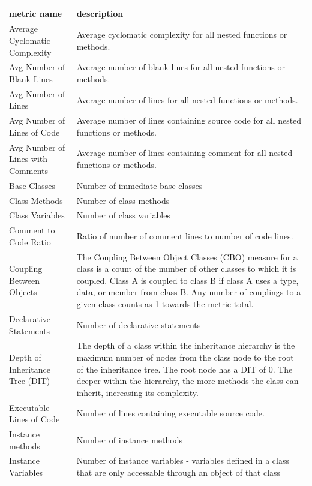 \begin{apendicesenv}
    \begin{center}
    \footnotesize
    \begin{longtabu} to 
    \toprule
    \textbf{metric name} & \textbf{description} \\ 
    \midrule
    \endhead
    Average Cyclomatic Complexity & Average cyclomatic complexity for all nested functions or methods. \\
    Avg Number of Blank Lines & Average number of blank lines for all nested functions or methods. \\
    Avg Number of Lines & Average number of lines for all nested functions or methods. \\
    Avg Number of Lines of Code & Average number of lines containing source code for all nested functions or methods. \\
    Avg Number of Lines with Comments & Average number of lines containing comment for all nested functions or methods. \\
    Base Classes & Number of immediate base classes \\
    Class Methods & Number of class methods \\
    Class Variables & Number of class variables \\
    Comment to Code Ratio & Ratio of number of comment lines to number of code lines. \\
    Coupling Between Objects & The Coupling Between Object Classes (CBO) measure for a class is a count of the number of other classes to which it is coupled. Class A is coupled to class B if class A uses a type, data, or member from class B. Any number of couplings to a given class counts as 1 towards the metric total. \\
    Declarative Statements & Number of declarative statements \\
    Depth of Inheritance Tree (DIT) & The depth of a class within the inheritance hierarchy is the maximum number of nodes from the class node to the root of the inheritance tree. The root node has a DIT of 0. The deeper within the hierarchy, the more methods the class can inherit, increasing its complexity. \\
    Executable Lines of Code & Number of lines containing executable source code. \\
    Instance methods & Number of instance methods \\
    Instance Variables & Number of instance variables - variables defined in a class that are only accessable through an object of that class \\

\end{longtabu}
\end{center}
\end{apendicesenv}
